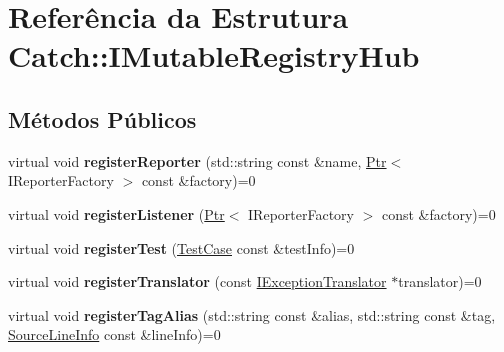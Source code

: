 \hypertarget{structCatch_1_1IMutableRegistryHub}{}\section{Referência da Estrutura Catch\+:\+:I\+Mutable\+Registry\+Hub}
\label{structCatch_1_1IMutableRegistryHub}
\subsection*{Métodos Públicos}
\begin{DoxyCompactItemize}
\item 
virtual void {\bfseries register\+Reporter} (std\+::string const \&name, \hyperlink{classCatch_1_1Ptr}{Ptr}$<$ I\+Reporter\+Factory $>$ const \&factory)=0\hypertarget{structCatch_1_1IMutableRegistryHub_aab72d0aa1fa14627f1a6a4c893ae0a12}{}\label{structCatch_1_1IMutableRegistryHub_aab72d0aa1fa14627f1a6a4c893ae0a12}

\item 
virtual void {\bfseries register\+Listener} (\hyperlink{classCatch_1_1Ptr}{Ptr}$<$ I\+Reporter\+Factory $>$ const \&factory)=0\hypertarget{structCatch_1_1IMutableRegistryHub_ae06fcb90ba3f2b389d450cd81e229276}{}\label{structCatch_1_1IMutableRegistryHub_ae06fcb90ba3f2b389d450cd81e229276}

\item 
virtual void {\bfseries register\+Test} (\hyperlink{classCatch_1_1TestCase}{Test\+Case} const \&test\+Info)=0\hypertarget{structCatch_1_1IMutableRegistryHub_a11b85c6744d88c9f83fe16ad4a8dd451}{}\label{structCatch_1_1IMutableRegistryHub_a11b85c6744d88c9f83fe16ad4a8dd451}

\item 
virtual void {\bfseries register\+Translator} (const \hyperlink{structCatch_1_1IExceptionTranslator}{I\+Exception\+Translator} $\ast$translator)=0\hypertarget{structCatch_1_1IMutableRegistryHub_ae6825365102693cf7707db022a2c2b49}{}\label{structCatch_1_1IMutableRegistryHub_ae6825365102693cf7707db022a2c2b49}

\item 
virtual void {\bfseries register\+Tag\+Alias} (std\+::string const \&alias, std\+::string const \&tag, \hyperlink{structCatch_1_1SourceLineInfo}{Source\+Line\+Info} const \&line\+Info)=0\hypertarget{structCatch_1_1IMutableRegistryHub_abf2e386b6f94f615719ada711adbf822}{}\label{structCatch_1_1IMutableRegistryHub_abf2e386b6f94f615719ada711adbf822}

\end{DoxyCompactItemize}



